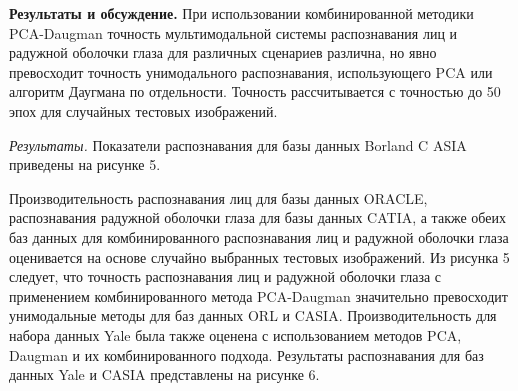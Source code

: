 \begin{multicols}{2}
{\bfseries Результаты и обсуждение.} При использовании комбинированной
методики PCA-Daugman точность мультимодальной системы распознавания лиц
и радужной оболочки глаза для различных сценариев различна, но явно
превосходит точность унимодального распознавания, использующего PCA или
алгоритм Даугмана по отдельности. Точность рассчитывается с точностью до
50 эпох для случайных тестовых изображений.

\emph{Результаты.} Показатели распознавания для базы данных Borland C
ASIA приведены на рисунке 5.

Производительность распознавания лиц для базы данных ORACLE,
распознавания радужной оболочки глаза для базы данных CATIA, а также
обеих баз данных для комбинированного распознавания лиц и радужной
оболочки глаза оценивается на основе случайно выбранных тестовых
изображений. Из рисунка 5 следует, что точность распознавания лиц и
радужной оболочки глаза с применением комбинированного метода
PCA-Daugman значительно превосходит унимодальные методы для баз данных
ORL и CASIA. Производительность для набора данных Yale была также
оценена с использованием методов PCA, Daugman и их комбинированного
подхода. Результаты распознавания для баз данных Yale и CASIA
представлены на рисунке 6.
\end{multicols}

